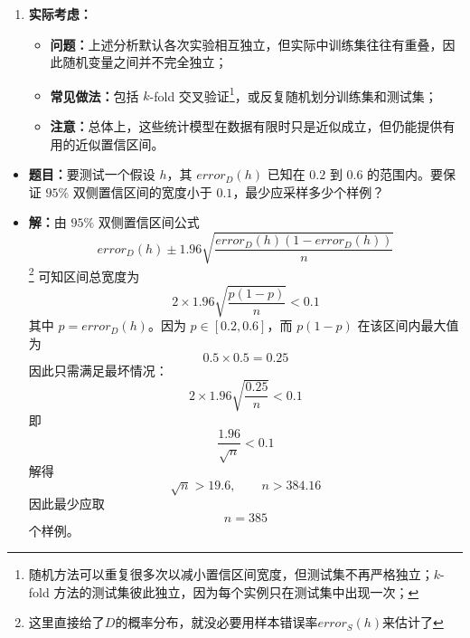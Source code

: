 \documentclass[../main.tex]{subfiles}
\begin{document}
\begin{enumerate}
    \item \textbf{实际考虑：}
    \begin{itemize}
        \item \textbf{问题：}上述分析默认各次实验相互独立，但实际中训练集往往有重叠，因此随机变量之间并不完全独立；
        \item \textbf{常见做法：}包括 $k$-fold 交叉验证\footnote{随机方法可以重复很多次以减小置信区间宽度，但测试集不再严格独立；$k$-fold 方法的测试集彼此独立，因为每个实例只在测试集中出现一次；}，或反复随机划分训练集和测试集；
        \item \textbf{注意：}总体上，这些统计模型在数据有限时只是近似成立，但仍能提供有用的近似置信区间。
    \end{itemize}
\end{enumerate}
{\small\kaishu
\begin{itemize}
    \item \textbf{题目：}要测试一个假设 $h$，其 $error_D(h)$ 已知在 $0.2$ 到 $0.6$ 的范围内。要保证 $95\%$ 双侧置信区间的宽度小于 $0.1$，最少应采样多少个样例？
    \item \textbf{解：}由 $95\%$ 双侧置信区间公式
    $$
    error_D(h)\pm 1.96\sqrt{\frac{error_D(h)\left(1-error_D(h)\right)}{n}}
    $$\footnote{这里直接给了$D$的概率分布，就没必要用样本错误率$error_S(h)$来估计了}
    可知区间总宽度为
    $$
    2\times 1.96\sqrt{\frac{p(1-p)}{n}}<0.1
    $$
    其中 $p=error_D(h)$。因为 $p\in[0.2,0.6]$，而 $p(1-p)$ 在该区间内最大值为
    $$
    0.5\times 0.5=0.25
    $$
    因此只需满足最坏情况：
    $$
    2\times 1.96\sqrt{\frac{0.25}{n}}<0.1
    $$
    即
    $$
    \frac{1.96}{\sqrt{n}}<0.1
    $$
    解得
    $$
    \sqrt{n}>19.6,\qquad n>384.16
    $$
    因此最少应取
    $$
    n=385
    $$
    个样例。
\end{itemize}
}
\end{document}
